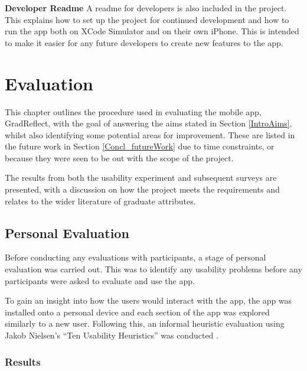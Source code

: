 \documentclass{l4proj}
\begin{document}
\textbf{Developer Readme} A readme for developers is also included in the project. This explains how to set up the project for continued development and how to run the app both on XCode Simulator and on their own iPhone. This is intended to make it easier for any future developers to create new features to the app. 

\chapter{Evaluation} \label{evaluation}

This chapter outlines the procedure used in evaluating the mobile app, GradReflect, with the goal of answering the aims stated in Section \ref{IntroAims}, whilst also identifying some potential areas for improvement. These are listed in the future work in Section \ref{Concl_futureWork} due to time constraints, or because they were seen to be out with the scope of the project. 

The results from both the usability experiment and subsequent surveys are presented, with a discussion on how the project meets the requirements and relates to the wider literature of graduate attributes.

\section{Personal Evaluation}

Before conducting any evaluations with participants, a stage of personal evaluation was carried out. This was to identify any usability problems before any participants were asked to evaluate and use the app. 
 
To gain an insight into how the users would interact with the app, the app was installed onto a personal device and each section of the app was explored similarly to a new user. Following this, an informal heuristic evaluation using Jakob Nielsen’s “Ten Usability Heuristics” was conducted \citep{Nielsen10}. 

\subsection{Results}
\end{document}
